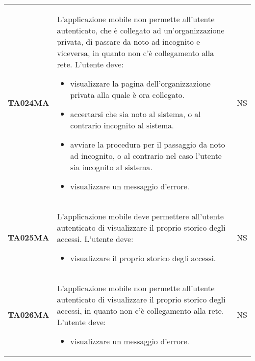 \documentclass[../../piano-di-qualifica.tex]{subfiles}
\begin{document}
\begin{longtable}[H]{>{\centering\bfseries}m{3cm} >{}m{10cm} >{\centering\arraybackslash}m{3cm}}
  TA024MA           & L'applicazione mobile non permette all'utente autenticato, che è collegato ad un'organizzazione privata, di passare da noto ad incognito e viceversa, in quanto non c'è collegamento alla rete. \newline
  L'utente deve:
  \begin{itemize}
    \item visualizzare la pagina dell'organizzazione privata alla quale è ora collegato.
    \item accertarsi che sia noto al sistema, o al contrario incognito al sistema.
    \item avviare la procedura per il passaggio da noto ad incognito, o al contrario nel caso l'utente sia incognito al sistema.
    \item visualizzare un messaggio d'errore.
  \end{itemize}
                    & NS                                                                                                                                                                                                                                                               \\
  TA025MA           & L'applicazione mobile deve permettere all'utente autenticato di visualizzare il proprio storico degli accessi. \newline
  L'utente deve:
  \begin{itemize}
    \item visualizzare il proprio storico degli accessi.
  \end{itemize}
                    & NS                                                                                                                                                                                                                                                               \\
  TA026MA           & L'applicazione mobile non permette all'utente autenticato di visualizzare il proprio storico degli accessi, in quanto non c'è collegamento alla rete. \newline
  L'utente deve:
  \begin{itemize}
    \item visualizzare un messaggio d'errore.
  \end{itemize}
                    & NS                                                                                                                                                                                                                                                               \\

\end{longtable}
\end{document}
